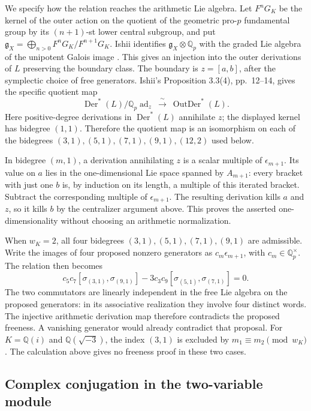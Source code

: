 \documentclass[11pt]{article}
\theoremstyle{definition}\newtheorem{definition}[theorem]{Definition}
\begin{document}
We specify how the relation reaches the arithmetic Lie algebra.
Let \(F^nG_K\) be the kernel of the outer action on the quotient
of the geometric pro-\(p\) fundamental group by its \((n+1)\)-st
lower central subgroup, and put
\(\mathfrak g_X=\bigoplus_{n>0}F^nG_K/F^{n+1}G_K\).
Ishii identifies \(\mathfrak g_X\otimes\mathbb Q_p\) with the
graded Lie algebra of the unipotent Galois image
\cite[Lemma 3.6, p.~14]{IshiiLie}. This gives an injection into
the outer derivations of \(L\) preserving the boundary class.
The boundary is \(z=[a,b]\), after the symplectic choice of free
generators. Ishii's Proposition 3.3(4), pp.~12--14, gives the
specific quotient map
\[
 \operatorname{Der}^{*}(L)/\mathbb Q_p\operatorname{ad}_z
       \ \xrightarrow{\ \sim\ }\ \operatorname{OutDer}^{*}(L).
\]
Here positive-degree derivations in \(\operatorname{Der}^{*}(L)\)
annihilate \(z\); the displayed kernel has bidegree \((1,1)\).
Therefore the quotient map is an isomorphism on each of the
bidegrees \((3,1),(5,1),(7,1),(9,1),(12,2)\) used below.

In bidegree \((m,1)\), a derivation annihilating \(z\) is a scalar
multiple of \(\epsilon_{m+1}\). Its value on \(a\) lies in the
one-dimensional Lie space spanned by \(A_{m+1}\): every bracket
with just one \(b\) is, by induction on its length, a multiple of
this iterated bracket. Subtract the corresponding multiple of
\(\epsilon_{m+1}\). The resulting derivation kills \(a\) and \(z\),
so it kills \(b\) by the centralizer argument above. This proves
the asserted one-dimensionality without choosing an arithmetic
normalization.

When \(w_K=2\), all four bidegrees \((3,1),(5,1),(7,1),(9,1)\)
are admissible. Write the images of four proposed nonzero generators
as \(c_m\epsilon_{m+1}\), with \(c_m\in\mathbb Q_p^\times\).
The relation then becomes
\[
 c_5c_7[\sigma_{(3,1)},\sigma_{(9,1)}]
 -3c_3c_9[\sigma_{(5,1)},\sigma_{(7,1)}]=0.
\]
The two commutators are linearly independent in the free Lie algebra
on the proposed generators: in its associative realization they
involve four distinct words. The injective arithmetic derivation
map therefore contradicts the proposed freeness. A vanishing
generator would already contradict that proposal.
For \(K=\mathbb Q(i)\) and \(\mathbb Q(\sqrt{-3})\), the index
\((3,1)\) is excluded by \(m_1\equiv m_2\pmod {w_K}\).
The calculation above gives no freeness proof in these two cases.

\subsection{Complex conjugation in the two-variable module}
\end{document}
